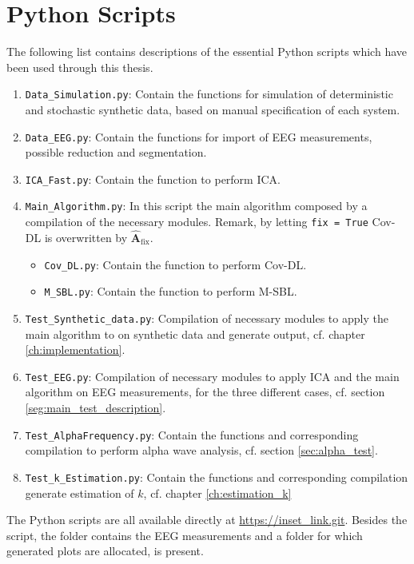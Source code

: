 \chapter{Python Scripts}\label{App:code}
The following list contains descriptions of the essential Python scripts which have been used through this thesis. 
\begin{enumerate}
\item \texttt{Data\_Simulation.py}: Contain the functions for simulation of deterministic and stochastic synthetic data, based on manual specification of each system.  
\item \texttt{Data\_EEG.py}: Contain the functions for import of EEG measurements, possible reduction and segmentation.  
\item \texttt{ICA\_Fast.py}: Contain the function to perform ICA.
\item \texttt{Main\_Algorithm.py}: In this script the main algorithm composed by a compilation of the necessary modules. Remark, by letting \texttt{fix = True} Cov-DL is overwritten by $\hat{\mathbf{A}}_{\text{fix}}$. 
\begin{itemize}
\item \texttt{Cov\_DL.py}: Contain the function to perform Cov-DL.
\item \texttt{M\_SBL.py}: Contain the function to perform M-SBL.
\end{itemize} 
\item \texttt{Test\_Synthetic\_data.py}: Compilation of necessary modules to apply the main algorithm to on synthetic data and generate output, cf. chapter \ref{ch:implementation}.
\item \texttt{Test\_EEG.py}: Compilation of necessary modules to apply ICA and the main algorithm on EEG measurements, for the three different cases, cf. section \ref{seg:main_test_description}.  
\item \texttt{Test\_AlphaFrequency.py}: Contain the functions and corresponding compilation to perform alpha wave analysis, cf. section \ref{sec:alpha_test}.
\item \texttt{Test\_k\_Estimation.py}: Contain the functions and corresponding compilation generate estimation of $k$, cf. chapter \ref{ch:estimation_k} 
\end{enumerate}
The Python scripts are all available directly at \url{https://inset_link.git}. Besides the script, the folder contains the EEG measurements and a folder for which generated plots are allocated, is present.  


	                                                                                                                                                                                                                                                                 
